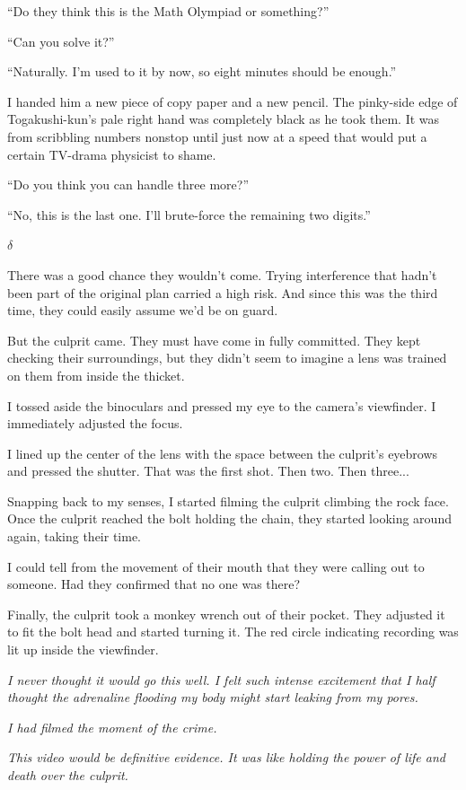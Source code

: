 \documentclass[
    a4paper,
    12pt,
    twoside,
    openany,
    UTF8,
    fontset=windows
]{ctexbook}
\begin{document}
``Do they think this is the Math Olympiad or something?''

``Can you solve it?''

``Naturally. I'm used to it by now, so eight minutes should be enough.''

I handed him a new piece of copy paper and a new pencil. The pinky-side edge of Togakushi-kun's pale right hand was completely black as he took them. It was from scribbling numbers nonstop until just now at a speed that would put a certain TV-drama physicist to shame.

``Do you think you can handle three more?''

``No, this is the last one. I'll brute-force the remaining two digits.''

$\delta$

There was a good chance they wouldn't come. Trying interference that hadn't been part of the original plan carried a high risk. And since this was the third time, they could easily assume we'd be on guard.

But the culprit came. They must have come in fully committed. They kept checking their surroundings, but they didn't seem to imagine a lens was trained on them from inside the thicket.

I tossed aside the binoculars and pressed my eye to the camera's viewfinder. I immediately adjusted the focus.

I lined up the center of the lens with the space between the culprit's eyebrows and pressed the shutter. That was the first shot. Then two. Then three...

Snapping back to my senses, I started filming the culprit climbing the rock face. Once the culprit reached the bolt holding the chain, they started looking around again, taking their time.

I could tell from the movement of their mouth that they were calling out to someone. Had they confirmed that no one was there?

Finally, the culprit took a monkey wrench out of their pocket. They adjusted it to fit the bolt head and started turning it. The red circle indicating recording was lit up inside the viewfinder.

\textit{I never thought it would go this well. I felt such intense excitement that I half thought the adrenaline flooding my body might start leaking from my pores.}

\textit{I had filmed the moment of the crime.}

\textit{This video would be definitive evidence. It was like holding the power of life and death over the culprit.}
\end{document}
